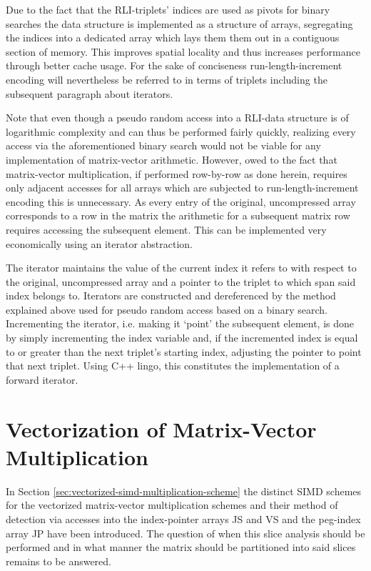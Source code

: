     Due to the fact that the RLI-triplets' indices are used as pivots for binary searches the data structure is
    implemented as a structure of arrays, segregating the indices into a dedicated array which lays them them out in a
    contiguous section of memory. This improves spatial locality and thus increases performance through better cache
    usage. For the sake of conciseness run-length-increment encoding will nevertheless be referred to in terms of
    triplets including the subsequent paragraph about iterators.

    Note that even though a pseudo random access into a RLI-data structure is of logarithmic complexity and can thus be
    performed fairly quickly, realizing every access via the aforementioned binary search would not be viable for any
    implementation of matrix-vector arithmetic. However, owed to the fact that matrix-vector multiplication, if
    performed row-by-row as done herein, requires only adjacent accesses for all arrays which are subjected to
    run-length-increment encoding this is unnecessary. As every entry of the original, uncompressed array corresponds
    to a row in the matrix the arithmetic for a subsequent matrix row requires accessing the subsequent element. This
    can be implemented very economically using an iterator abstraction.

    The iterator maintains the value of the current index it refers to with respect to the original, uncompressed array
    and a pointer to the triplet to which span said index belongs to. Iterators are constructed and dereferenced by the
    method explained above used for pseudo random access based on a binary search. Incrementing the iterator, i.e.
    making it `point' the subsequent element, is done by simply incrementing the index variable and, if the incremented
    index is equal to or greater than the next triplet's starting index, adjusting the pointer to point that next
    triplet. Using C++ lingo, this constitutes the implementation of a forward iterator.

    \section{Vectorization of Matrix-Vector Multiplication} \label{sec:vectorization-of-mvm}

      In Section \ref{sec:vectorized-simd-multiplication-scheme} the distinct SIMD schemes for the vectorized
      matrix-vector multiplication schemes and their method of detection via accesses into the index-pointer arrays JS
      and VS and the peg-index array JP have been introduced. The question of when this slice analysis should be
      performed and in what manner the matrix should be partitioned into said slices remains to be answered.

